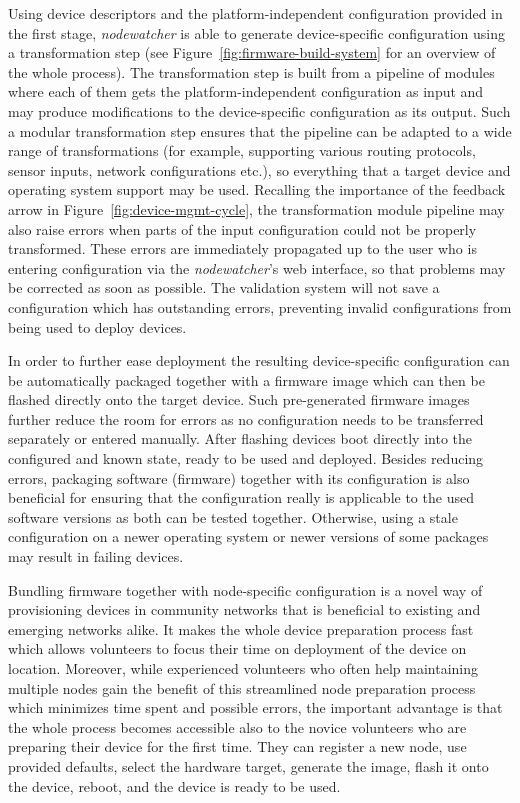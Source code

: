 \documentclass[5p,sort&compress]{elsarticle}
\newcommand{\nodewatcher}{\textit{nodewatcher}}
\begin{document}
Using device descriptors and the platform-independent configuration provided in the first stage, \nodewatcher{} is able to generate device-specific configuration using a transformation step (see Figure~\ref{fig:firmware-build-system} for an overview of the whole process).
The transformation step is built from a pipeline of modules where each of them gets the platform-independent configuration as input and may produce modifications to the device-specific configuration as its output.
Such a modular transformation step ensures that the pipeline can be adapted to a wide range of transformations (for example, supporting various routing protocols, sensor inputs, network configurations etc.), so everything that a target device and operating system support may be used.
Recalling the importance of the feedback arrow in Figure~\ref{fig:device-mgmt-cycle}, the transformation module pipeline may also raise errors when parts of the input configuration could not be properly transformed.
These errors are immediately propagated up to the user who is entering configuration via the \nodewatcher{}'s web interface, so that problems may be corrected as soon as possible.
The validation system will not save a configuration which has outstanding errors, preventing invalid configurations from being used to deploy devices.

In order to further ease deployment the resulting device-specific configuration can be automatically packaged together with a firmware image which can then be flashed directly onto the target device.
Such pre-generated firmware images further reduce the room for errors as no configuration needs to be transferred separately or entered manually.
After flashing devices boot directly into the configured and known state, ready to be used and deployed.
Besides reducing errors, packaging software (firmware) together with its configuration is also beneficial for ensuring that the configuration really is applicable to the used software versions as both can be tested together.
Otherwise, using a stale configuration on a newer operating system or newer versions of some packages may result in failing devices.

Bundling firmware together with node-specific configuration is a novel way of provisioning devices in community networks that is beneficial to existing and emerging networks alike.
It makes the whole device preparation process fast which allows volunteers to focus their time on deployment of the device on location.
Moreover, while experienced volunteers who often help maintaining multiple nodes gain the benefit of this streamlined node preparation process which minimizes time spent and possible errors, the important advantage is that the whole process becomes accessible also to the novice volunteers who are preparing their device for the first time.
They can register a new node, use provided defaults, select the hardware target, generate the image, flash it onto the device, reboot, and the device is ready to be used.
\end{document}

